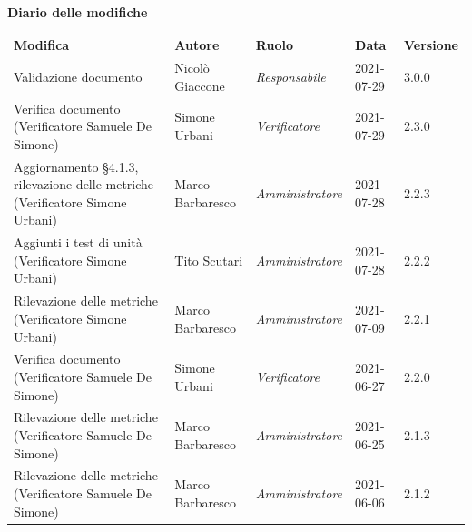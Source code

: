 \documentclass[a4paper]{article}
\begin{document}
\begin{center}
    \textbf{\Large Diario delle modifiche}\\
    \vspace{10px}
    \begin{table}[h!]
        \centering
        \renewcommand{\arraystretch}{1.8}
        \begin{tabular}{p{150px} p{90px} p{70px} p{60px} p{45px}}
            \rowcolor{logo!70} \textbf{Modifica}                                                     & \textbf{Autore}   & \textbf{Ruolo}          & \textbf{Data} & \textbf{Versione} \\
            Validazione documento                                                                    & Nicolò Giaccone   & \textit{Responsabile}   & 2021-07-29    & 3.0.0             \\
            Verifica documento \newline (Verificatore Samuele De Simone)                             & Simone Urbani     & \textit{Verificatore}   & 2021-07-29    & 2.3.0             \\
            Aggiornamento \S 4.1.3, rilevazione delle metriche \newline (Verificatore Simone Urbani) & Marco Barbaresco  & \textit{Amministratore} & 2021-07-28    & 2.2.3             \\
            Aggiunti i test di unità \newline (Verificatore Simone Urbani)                           & Tito Scutari      & \textit{Amministratore} & 2021-07-28    & 2.2.2             \\
            Rilevazione delle metriche \newline (Verificatore Simone Urbani)                         & Marco Barbaresco  & \textit{Amministratore} & 2021-07-09    & 2.2.1             \\
            Verifica documento \newline (Verificatore Samuele De Simone)                             & Simone Urbani     & \textit{Verificatore}   & 2021-06-27    & 2.2.0             \\
            Rilevazione delle metriche \newline (Verificatore Samuele De Simone)                     & Marco Barbaresco  & \textit{Amministratore} & 2021-06-25    & 2.1.3             \\
            Rilevazione delle metriche \newline (Verificatore Samuele De Simone)                     & Marco Barbaresco  & \textit{Amministratore} & 2021-06-06    & 2.1.2             \\

\end{tabular}
\end{table}
\end{center}
\end{document}
